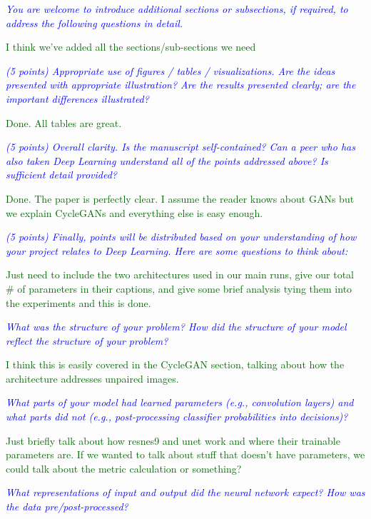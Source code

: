 \documentclass[10pt,twocolumn,letterpaper]{article}
\begin{document}
\textit{\textcolor{blue}{You are welcome to introduce additional sections or subsections, if required, to address the following questions in detail.}}

\textcolor{darkgreen}{I think we've added all the sections/sub-sections we need}

\textit{\textcolor{blue}{(5 points) Appropriate use of figures / tables / visualizations. Are the ideas presented with appropriate illustration? Are the results presented clearly; are the important differences illustrated?}}

\textcolor{darkgreen}{Done. All tables are great.}

\textit{\textcolor{blue}{(5 points) Overall clarity. Is the manuscript self-contained? Can a peer who has also taken Deep Learning understand all of the points addressed above? Is sufficient detail provided?}}

\textcolor{darkgreen}{Done. The paper is perfectly clear. I assume the reader knows about GANs but we explain CycleGANs and everything else is easy enough.}

\textit{\textcolor{blue}{(5 points) Finally, points will be distributed based on your understanding of how your project relates to Deep Learning. Here are some questions to think about:}}

\textcolor{darkgreen}{Just need to include the two architectures used in our main runs, give our total \# of parameters in their captions, and give some brief analysis tying them into the experiments and this is done.}

\textit{\textcolor{blue}{What was the structure of your problem? How did the structure of your model reflect the structure of your problem?}}

\textcolor{darkgreen}{I think this is easily covered in the CycleGAN section, talking about how the architecture addresses unpaired images.}

\textit{\textcolor{blue}{What parts of your model had learned parameters (e.g., convolution layers) and what parts did not (e.g., post-processing classifier probabilities into decisions)? }}

\textcolor{darkgreen}{Just briefly talk about how resnes9 and unet work and where their trainable parameters are. If we wanted to talk about stuff that doesn't have parameters, we could talk about the metric calculation or something?}

\textit{\textcolor{blue}{What representations of input and output did the neural network expect? How was the data pre/post-processed?}}
\end{document}
